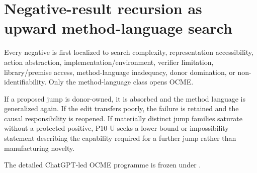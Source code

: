 \section{Negative-result recursion as upward method-language search}
Every negative is first localized to search complexity, representation accessibility, action abstraction, implementation/environment, verifier limitation, library/premise access, method-language inadequacy, donor domination, or non-identifiability. Only the method-language class opens OCME.

If a proposed jump is donor-owned, it is absorbed and the method language is generalized again. If the edit transfers poorly, the failure is retained and the causal responsibility is reopened. If materially distinct jump families saturate without a protected positive, P10-U seeks a lower bound or impossibility statement describing the capability required for a further jump rather than manufacturing novelty.

The detailed ChatGPT-led OCME programme is frozen under
.
